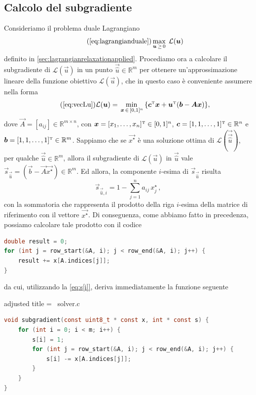 \subsection{Calcolo del subgradiente}
Consideriamo il problema duale Lagrangiano
\begin{equation}\tag{\ref{eq:lagrangianduale}}
    \max_{\vec{u} \,\geq\, 0}\; \mathcal{L}(\vec{u})
\end{equation}
definito in \ref{sec:lagrangianrelaxationapplied}.
Procediamo ora a calcolare il subgradiente di \(
\mathcal{L}(\vec{u}) \) in un punto \( \vec{\hat{u}} \in \mathbb{R}^m\) per ottenere un'approssimazione lineare della funzione obiettivo
\( \mathcal{L}(\vec{u}) \), che in questo caso è conveniente assumere nella forma
\begin{equation}
\tag{\ref{eq:vecLu}}
    \mathcal{L}(\vec{u}) = \min_{\,\vec{x} \,\in\,[0, 1]^n}\, \{\vec{c}^{\tr}\vec{x} +
    \vec{u}^{\tr}(\vec{b}-\vec{A}\vec{x})\},
\end{equation}
dove \( \vec{A} = [a_{ij}] \in \mathbb{R}^{m\times n}\), con \( \bm{x} = [x_1, \ldots, x_n]^{\scriptscriptstyle\mathrm{T}} \in
[0, 1]^n \), \( \bm{c} = [1, 1, \ldots, 1]^{\scriptscriptstyle\mathrm{T}} \in \mathbb{R}^n \) e \( \bm{b} = [1, 1, \ldots, 1]^{\scriptscriptstyle\mathrm{T}} \in
\mathbb{R}^m \).
Sappiamo che se \( \vec{x^{\star}} \) è una soluzione ottima di \( \mathcal{L}(\vec{\vec{\hat{u}}}) \), per qualche \(
\vec{\hat{u}} \in \mathbb{R}^m \), allora il subgradiente di \( \mathcal{L}(\vec{u}) \) in \( \vec{\hat{u}} \) vale \(
\vec{s}_{\vec{\hat{u}}} = (\vec{b} - \vec{A}\vec{x^{\star}}) \in \mathbb{R}^m \). Ed allora, la componente \( i \)-esima
di \( \vec{s}_{\vec{\hat{u}}} \) risulta
\begin{equation}\label{eq:s[i]}
    \vec{s}_{\vec{\hat{u}}, i} = 1 - \sum_{j = 1}^n a_{ij}\,x^{\star}_j\,,
\end{equation}
con la sommatoria che rappresenta il prodotto della riga \( i \)-esima della matrice di riferimento con il vettore  \(
\vec{x^{\star}} \). Di conseguenza, come abbiamo fatto in precedenza, possiamo calcolare tale prodotto con il codice
\begin{inline}
\begin{lstlisting}[style = style2, language=c]
double result = 0;
for (int j = row_start(&A, i); j < row_end(&A, i); j++) {
    result += x[A.indices[j]];
}
\end{lstlisting}
\end{inline}
\noindent
da cui, utilizzando la \eqref{eq:s[i]}, deriva immediatamente la funzione seguente
\begin{code}{adjusted title = {\cicon\ solver.c}}
\begin{lstlisting}[language=c, style = style, caption={Calcolo del subgradiente \( \vec{s}_k \) di \(
\mathcal{L}(\vec{u}) \) in \( \vec{u}_k \).}]
void subgradient(const uint8_t * const x, int * const s) {
    for (int i = 0; i < m; i++) {
        s[i] = 1;
        for (int j = row_start(&A, i); j < row_end(&A, i); j++) {
            s[i] -= x[A.indices[j]];
        }
    }
}
\end{lstlisting}
\end{code}
